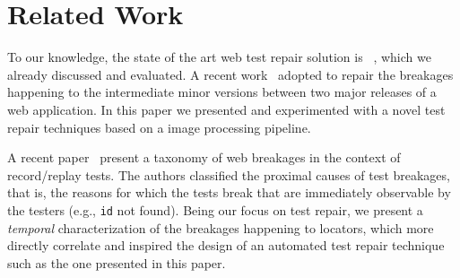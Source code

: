 \section{Related Work}\label{sec:relwork}

 To our knowledge, the state of the art web test repair solution is \water~\cite{Choudhary:2011:WWA:2002931.2002935}, which we already discussed and evaluated. 
%
A recent work~\cite{Hammoudi-2016-FSE} adopted \water to repair the breakages happening to  the intermediate minor versions between two major releases of a web application. In this paper we presented and experimented with a novel test repair techniques based on a image processing pipeline. 

A recent paper~\cite{Hammoudi-2016-ICST} present a taxonomy of web breakages in the context of record/replay tests. The authors classified the proximal causes of test breakages, that is, the reasons for which the tests break that are immediately observable by the testers (e.g., \texttt{id} not found). Being our focus on test repair, we present a \textit{temporal} characterization of the breakages happening to locators, which  more directly correlate and inspired the design of an automated test repair technique such as the one presented in this paper.

